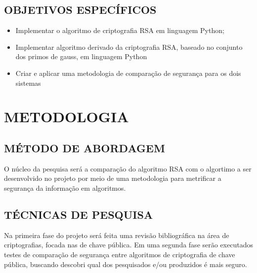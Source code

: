 \documentclass[]{article}
\begin{document}
\subsection{OBJETIVOS ESPECÍFICOS}
\begin{itemize}
	\item Implementar o algoritmo de criptografia RSA em linguagem Python;
	\item Implementar algoritmo derivado da criptografia RSA, baseado no conjunto dos primos de gauss, em linguagem Python
	\item Criar e aplicar uma metodologia de comparação de segurança para os dois sistemas
\end{itemize}

\section{METODOLOGIA}
\subsection{MÉTODO DE ABORDAGEM}
O núcleo da pesquisa será a comparação do algoritmo RSA com o algortimo a ser desenvolvido no projeto por meio de uma metodologia para metrificar a segurança da informação em algoritmos.
\subsection{TÉCNICAS DE PESQUISA}
Na primeira fase do projeto será feita uma revisão bibliográfica na área de criptografias, focada nas de chave pública. Em uma segunda fase serão executados testes de comparação de segurança entre algoritmos de criptografia de chave pública, buscando descobri qual dos pesquisados e/ou produzidos é mais seguro.
\end{document}
